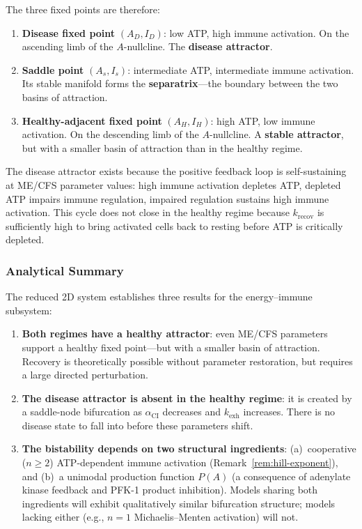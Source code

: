 The three fixed points are therefore:

\begin{enumerate}
    \item \textbf{Disease fixed point} $(A_D, I_D)$: low ATP, high immune activation. On the ascending limb of the $A$-nullcline. The \textbf{disease attractor}.
    \item \textbf{Saddle point} $(A_s, I_s)$: intermediate ATP, intermediate immune activation. Its stable manifold forms the \textbf{separatrix}---the boundary between the two basins of attraction.
    \item \textbf{Healthy-adjacent fixed point} $(A_H, I_H)$: high ATP, low immune activation. On the descending limb of the $A$-nullcline. A \textbf{stable attractor}, but with a smaller basin of attraction than in the healthy regime.
\end{enumerate}

The disease attractor exists because the positive feedback loop is self-sustaining at ME/CFS parameter values: high immune activation depletes ATP, depleted ATP impairs immune regulation, impaired regulation sustains high immune activation. This cycle does not close in the healthy regime because $k_{\text{recov}}$ is sufficiently high to bring activated cells back to resting before ATP is critically depleted.

\subsubsection{Analytical Summary}
\label{sec:attractor-summary}

The reduced 2D system establishes three results for the energy--immune subsystem:

\begin{enumerate}
    \item \textbf{Both regimes have a healthy attractor}: even ME/CFS parameters support a healthy fixed point---but with a smaller basin of attraction. Recovery is theoretically possible without parameter restoration, but requires a large directed perturbation.
    \item \textbf{The disease attractor is absent in the healthy regime}: it is created by a saddle-node bifurcation as $\alpha_{\text{CI}}$ decreases and $k_{\text{exh}}$ increases. There is no disease state to fall into before these parameters shift.
    \item \textbf{The bistability depends on two structural ingredients}: (a)~cooperative ($n \geq 2$) ATP-dependent immune activation (Remark~\ref{rem:hill-exponent}), and (b)~a unimodal production function $P(A)$ (a consequence of adenylate kinase feedback and PFK-1 product inhibition). Models sharing both ingredients will exhibit qualitatively similar bifurcation structure; models lacking either (e.g., $n = 1$ Michaelis--Menten activation) will not.
\end{enumerate}

